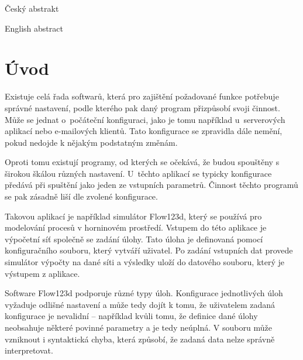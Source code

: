 \documentclass[FM,bw,DP]{tulthesis}
\begin{document}

\begin{abstractCZ}
\thispagestyle{empty}
Český abstrakt
\end{abstractCZ}

\vspace{2cm}
\begin{abstractEN}
English abstract
\end{abstractEN}

\clearpage
\begin{acknowledgement}

\end{acknowledgement}

\renewcommand\contentsname{Obsah\vspace{-30pt}}
\tableofcontents
\clearpage

\begin{abbrList}
\end{abbrList}

\chapter*{Úvod}

Existuje celá řada softwarů, která pro zajištění požadované funkce potřebuje správné nastavení, podle kterého pak daný program přizpůsobí svoji činnost. Může se jednat o~počáteční konfiguraci, jako je tomu například u~serverových aplikací nebo e-mailových klientů. Tato konfigurace se zpravidla dále nemění, pokud nedojde k nějakým podstatným změnám.

Oproti tomu existují programy, od kterých se očekává, že budou spouštěny s širokou škálou různých nastavení. U~těchto aplikací se typicky konfigurace předává při spuštění jako jeden ze vstupních parametrů. Činnost těchto programů se pak zásadně liší dle zvolené konfigurace.

Takovou aplikací je například simulátor Flow123d, který se používá pro modelování procesů v horninovém prostředí. Vstupem do této aplikace je výpočetní síť společně se zadání úlohy. Tato úloha je definovaná pomocí konfiguračního souboru, který vytváří uživatel. Po zadání vstupních dat provede simulátor výpočty na dané síti a výsledky uloží do datového souboru, který je výstupem z aplikace.

Software Flow123d podporuje různé typy úloh. Konfigurace jednotlivých úloh vyžaduje odlišné nastavení a může tedy dojít k tomu, že uživatelem zadaná konfigurace je nevalidní -- například kvůli tomu, že definice dané úlohy neobsahuje některé povinné parametry a je tedy neúplná. V souboru může vzniknout i syntaktická chyba, která způsobí, že zadaná data nelze správně interpretovat.
\end{document}
